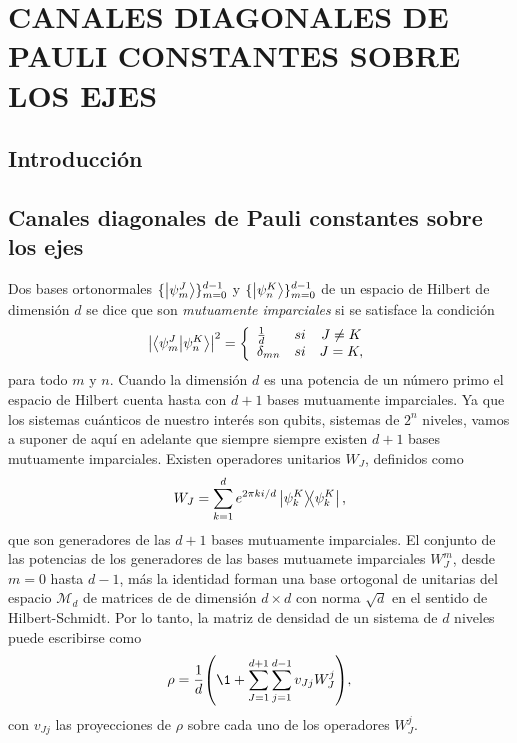 \chapter{CANALES DIAGONALES DE PAULI CONSTANTES 
SOBRE LOS EJES}

\section{Introducción}

\section{Canales diagonales de Pauli constantes sobre los ejes}

Dos bases ortonormales $\{\ket{\psi_m^J}\}_{m=0}^{d-1}$
y $\{\ket{\psi_n^K}\}_{m=0}^{d-1}$ de un espacio de Hilbert
de dimensión $d$ se dice que son \textit{mutuamente 
imparciales} si se satisface la 
condición~\cite{bengtsson_zyczkowski_2017,nathanson2007pauli}
\begin{align}\label{eq:mub_definition}
	\abs{\braket{\psi_m^J}{\psi_n^K}}^2=
	\left\{ \begin{array}{lcc}
             \frac{1}{d} & si & J\ne K \\
             \delta_{mn} & si & J=K,
             \end{array}
   \right.
\end{align}
para todo $m$ y $n$. Cuando la dimensión $d$  es una potencia de un 
número primo el espacio de Hilbert cuenta hasta con $d+1$ bases mutuamente
imparciales. Ya que los sistemas cuánticos de nuestro interés son qubits, 
sistemas de $2^n$ niveles, vamos a suponer de aquí en adelante que 
siempre siempre existen $d+1$ bases mutuamente imparciales. 
Existen operadores unitarios $W_J$, definidos como~\cite{nathanson2007pauli}
\begin{align}\label{eq:W_J}
	W_J=\sum_{k=1}^d e^{2\pi k i/d} \dyad{\psi_k^K}{\psi_k^K}, 
\end{align}
que son generadores de las $d+1$
bases mutuamente imparciales. El conjunto de las potencias de los 
generadores de las bases mutuamete imparciales $W_J^m$,
desde $m=0$ hasta $d-1$, más la identidad forman una base ortogonal
de unitarias del espacio $\mathcal{M}_d$ de matrices de 
de dimensión $d\times d$ con norma $\sqrt{d}$
en el sentido de Hilbert-Schmidt. Por lo tanto, la matriz de densidad
de un sistema de $d$ niveles puede escribirse como
\begin{align}\label{eq:rho_mub}
\rho=\frac{1}{d}\qty(\1+\sum_{J=1}^{d+1}\sum_{j=1}^{d-1} v_{Jj}W_J^j),
\end{align}
con $v_{Jj}$ las proyecciones de $\rho$ sobre cada uno de los 
operadores $W_J^j$.

